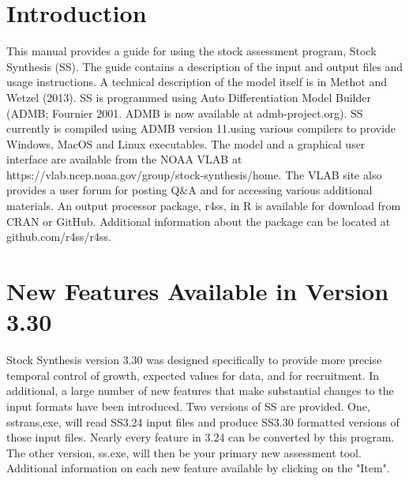 
 \section{Introduction}\label{sec:intro}
This manual provides a guide for using the stock assessment program, Stock Synthesis (SS). The guide contains a description of the input and output files and usage instructions. A technical description of the model itself is in Methot and Wetzel (2013). SS is programmed using Auto Differentiation Model Builder (ADMB; Fournier 2001. ADMB is now available at admb-project.org). SS currently is compiled using ADMB version 11.using various compilers to provide Windows, MacOS and Linux executables. The model and a graphical user interface are available from the NOAA VLAB at https://vlab.ncep.noaa.gov/group/stock-synthesis/home. The VLAB site also provides a user forum for posting Q\&A and for accessing various additional materials.  An output processor package, r4ss, in R is available for download from CRAN or GitHub. Additional information about the package can be located at github.com/r4ss/r4ss.
	
\section{New Features Available in Version 3.30}
		Stock Synthesis version 3.30 was designed specifically to provide more precise temporal control of growth, expected values for data, and for recruitment.  In additional, a large number of new features that make substantial changes to the input formats have been introduced.  Two versions of SS are provided.  One, sstrans,exe, will read SS3.24 input files and produce SS3.30 formatted versions of those input files.  Nearly every feature in 3.24 can be converted by this program.  The other version, ss.exe, will then be your primary new assessment tool. Additional information on each new feature available by clicking on the "Item".
		
